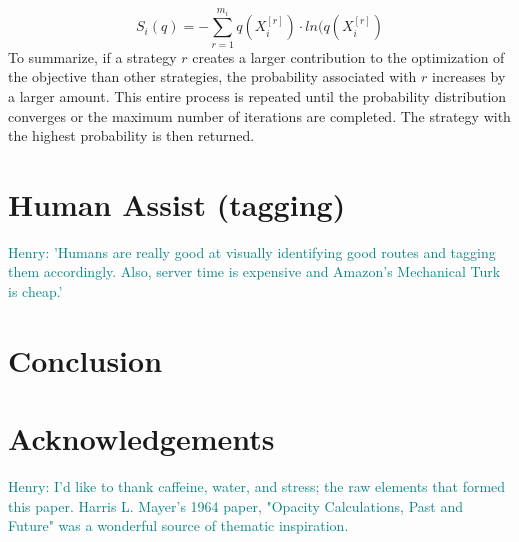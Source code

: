 \documentclass{sig-alternate}
\newcommand{\allcomments}[1]{{#1}}
\newcommand{\hfcomment}[1]{\textcolor{Teal}{\allcomments{Henry: {#1}}}}
\begin{document}
	\begin{equation}
	S_i(q)=-\sum_{r=1}^{m_i}q(X_i^{[r]})\cdot ln(q(X_i^{[r]})
	\end{equation}
To summarize, if a strategy $r$ creates a larger contribution to the optimization of the objective than other strategies, the probability associated with $r$ increases by a larger amount. This entire process is repeated until the probability distribution converges or the maximum number of iterations are completed. The strategy with the highest probability is then returned. 
\section{Human Assist (tagging)}
\label{sec:humans}
\hfcomment{'Humans are really good at visually identifying good routes and tagging them accordingly. Also, server time is expensive and Amazon's Mechanical Turk is cheap.'}

\section{Conclusion}
\label{conclusion}

\section{Acknowledgements}
\hfcomment{I'd like to thank caffeine, water, and stress; the raw elements that formed this paper. Harris L. Mayer's 1964 paper, "Opacity Calculations, Past and Future" was a wonderful source of thematic inspiration.}


  

\end{document}
